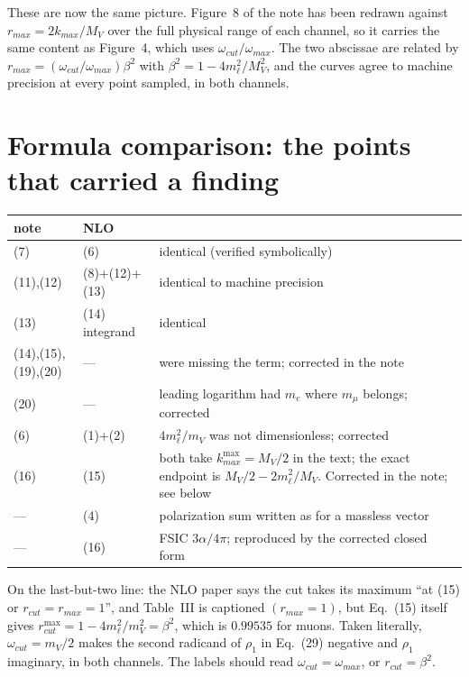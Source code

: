 \documentclass[11pt]{article}
\begin{document}
These are now the same picture. Figure~8 of the note has been redrawn against
$r_{max}=2k_{max}/M_V$ over the full physical range of each channel, so it
carries the same content as Figure~4, which uses $\omega_{cut}/\omega_{max}$.
The two abscissae are related by $r_{max}=(\omega_{cut}/\omega_{max})\beta^{2}$
with $\beta^{2}=1-4m_\ell^{2}/M_V^{2}$, and the curves agree to machine precision
at every point sampled, in both channels.

\section{Formula comparison: the points that carried a finding}

\begin{center}
\begin{tabular}{llp{8.6cm}}
\toprule
note & NLO & \\
\midrule
(7)        & (6)            & identical (verified symbolically)\\
(11),(12)  & (8)+(12)+(13)  & identical to machine precision\\
(13)       & (14) integrand & identical\\
(14),(15),(19),(20) & ---   & were missing the term; corrected in the note\\
(20)       & ---            & leading logarithm had $m_e$ where $m_\mu$ belongs; corrected\\
(6)        & (1)+(2)        & $4m_\ell^2/m_V$ was not dimensionless; corrected\\
(16)       & (15)           & both take $k_{max}^{\max}=M_V/2$ in the text; the exact endpoint is
                              $M_V/2-2m_\ell^2/M_V$. Corrected in the note; see below\\
---        & (4)            & polarization sum written as for a massless vector\\
---        & (16)           & FSIC $3\alpha/4\pi$; reproduced by the corrected closed form\\
\bottomrule
\end{tabular}
\end{center}

On the last-but-two line: the NLO paper says the cut takes its maximum ``at (15)
or $r_{cut}=r_{max}=1$'', and Table~III is captioned $(r_{max}=1)$, but Eq.~(15)
itself gives $r_{cut}^{\max}=1-4m_\ell^{2}/m_V^{2}=\beta^{2}$, which is $0.99535$
for muons. Taken literally, $\omega_{cut}=m_V/2$ makes the second radicand of
$\rho_1$ in Eq.~(29) negative and $\rho_1$ imaginary, in both channels. The
labels should read $\omega_{cut}=\omega_{max}$, or $r_{cut}=\beta^{2}$.
\end{document}

